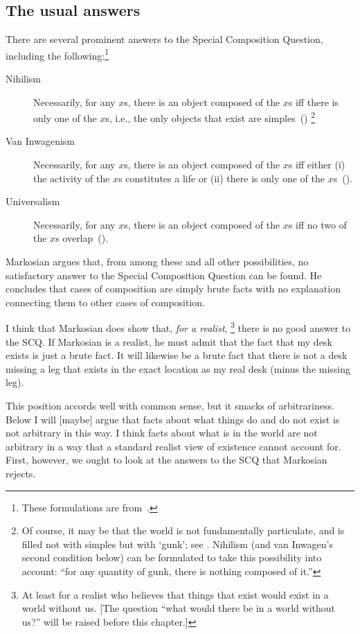 \subsection{The usual answers}
There are several prominent answers to the Special Composition Question, including the following:\footnote{These formulations are from~\citet{markosian1998a}.}
\begin{description}
	\item[Nihilism] Necessarily, for any $x$s, there is an object composed of the $x$s iff there is only one of the $x$s, i.e., the only objects that exist are simples~(\citeyear[219]{markosian1998a})%
		\footnote{Of course, it may be that the world is not fundamentally particulate, and is filled not with simples but with `gunk'; see \citet{schaffer2003}. Nihilism (and van Inwagen's second condition below) can be formulated to take this possibility into account: ``for any quantity of gunk, there is nothing composed of it.''}%
	\item[Van Inwagenism] Necessarily, for any $x$s, there is an object composed of the $x$s iff either (i) the activity of the $x$s constitutes a life or (ii) there is only one of the $x$s~(\citeyear[221]{markosian1998a}).
	\item[Universalism] Necessarily, for any $x$s, there is an object composed of the $x$s iff no two of the $x$s overlap~(\citeyear[227]{markosian1998a}).
\end{description}

Markosian argues that, from among these and all other possibilities, no satisfactory answer to the Special Composition Question can be found. He concludes that cases of composition are simply brute facts with no explanation connecting them to other cases of composition.

I think that Markosian does show that, {\em for a realist},%
\footnote{At least for a realist who believes that things that exist would exist in a world without us. [The question ``what would there be in a world without us?'' will be raised before this chapter.]} %
%
there is no good answer to the SCQ. If Markosian is a realist, he must admit that the fact that my desk exists is just a brute fact. It will likewise be a brute fact that there is not a desk missing a leg that exists in the exact location as my real desk (minus the missing leg).

This position accords well with common sense, but it smacks of arbitrariness. Below I will [maybe] argue that facts about what things do and do not exist is not arbitrary in this way. I think facts about what is in the world are not arbitrary in a way that a standard realist view of existence cannot account for. First, however, we ought to look at the answers to the SCQ that Markosian rejects.

